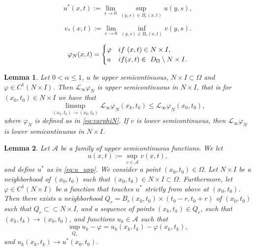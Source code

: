 \documentclass[10pt,a4paper]{amsart}
\newtheorem{lem}{Lemma}
\providecommand{\Linf}{\mathcal{L}_{\infty}}
\providecommand{\Ns}{N \times I}
\providecommand{\Rnp}{D_{\Omega}}
\begin{document}
\begin{equation}\label{eq:u_upp}
    u^*(x,t) := \lim_{\epsilon \to 0} \sup_{(y,s) \in B_{\epsilon}(x,t)} u(y,s),
\end{equation}

\begin{equation}\label{eq:u_low}
    v_*(x,t) := \lim_{\epsilon \to 0} \inf_{(y,s) \in B_{\epsilon}(x,t)} v(y,s).
\end{equation}

\begin{align}\label{eq:varphiN}
     \varphi_{N}(x,t)= \begin{cases}
                      \varphi & \textup{if  } \ (x,t) \in \Ns,\\
                      u & \textup{if  } (x,t) \in \ \Rnp   \setminus \Ns.
            \end{cases}
 \end{align} 

\begin{lem}\label{lem:Linfusc}
    Let $0<\alpha \leq 1$, $u$ be upper semicontinuous, $\Ns \subset \Omega$ and $\varphi \in C^1(\Ns)$. Then $\Linf \varphi_{N}$ is upper semicontinuous in $\Ns$, that is for $(x_0,t_0) \in \Ns$ we have that
    \begin{equation*}
        \limsup_{(x_k,t_k) \to (x_0,t_0)} \Linf \varphi_{N}(x_k,t_k) \leq \Linf \varphi_{N}(x_0,t_0),
    \end{equation*}
    where $\varphi_{N}$ is defined as in \eqref{eq:varphiN}. If $v$ is lower semicontinuous, then $\Linf \varphi_{N}$ is lower semicontinuous in $\Ns$.
\end{lem}

\begin{lem}\label{lem:strictmax}
    Let $\mathcal{A}$ be a family of upper semicontinuous functions. We let 
    \begin{equation*}
        u(x,t):= \sup_{v \in \mathcal{A}} v(x,t),
    \end{equation*}
and define $u^*$ as in \eqref{eq:u_upp}. We consider a point $(x_0, t_0) \in \Omega.$ Let $\Ns $ be a neighborhood of $(x_0,t_0)$ such that $(x_0,t_0)\in \Ns \subset \Omega$. Furthermore, let $\varphi \in C^1(\Ns)$ be a function that touches $u^*$ strictly from above at $(x_0,t_0)$. Then there exists a neighborhood $Q_r= B_r(x_0,t_0) \times (t_0-r,t_0+r)$ of $(x_0,t_0)$ such that $Q_r \subset \subset \Ns$, and a sequence of points $(x_k,t_k) \in Q_r$, such that $(x_k,t_k)\to (x_0, t_0)$, and functions $u_k \in \mathcal{A}$ such that 
    \begin{equation}\label{eq:supoverN}
         \sup_{Q_r} u_k-\varphi = u_k(x_k,t_k)-\varphi(x_k,t_k),
    \end{equation}
     and $u_k(x_k,t_k) \to u^*(x_0, t_0)$.
\end{lem}
\end{document}
